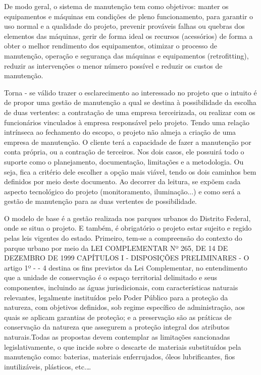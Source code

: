 	De modo geral, o sistema de manutenção tem como objetivos: manter os equipamentos e máquinas em condições de pleno funcionamento, para garantir o uso normal e a qualidade do projeto, prevenir prováveis falhas ou quebras dos elementos das máquinas, gerir de forma ideal os recursos (acessórios) de forma a obter o melhor rendimento dos equipamentos, otimizar o processo de manutenção, operação e segurança das máquinas e equipamentos (retrofitting), reduzir as intervenções o menor número possível e reduzir os custos de manutenção.
	
	Torna - se válido trazer o esclarecimento ao interessado no projeto que o intuito é de propor uma gestão de manutenção a qual se destina à possibilidade da escolha de duas vertentes: a contratação de uma empresa terceirizada, ou realizar com os funcionários vinculados à empresa responsável pelo projeto.  Tendo uma relação intrínseca ao fechamento do escopo, o projeto não almeja a criação de uma empresa de manutenção. O cliente terá a capacidade de fazer a manutenção por conta própria, ou a contração de terceiros. Nos dois casos, ele possuirá todo o suporte como o planejamento, documentação, limitações e a metodologia. Ou seja, fica a critério dele escolher a opção mais viável, tendo os dois caminhos bem definidos por meio deste documento. Ao decorrer da leitura, se expõem cada aspecto tecnológico do projeto (monitoramento, iluminação...) e como será a gestão de manutenção para as duas vertentes de possibilidade.
	
	O modelo de base é a gestão realizada nos parques urbanos do Distrito Federal, onde se situa o projeto. E também, é obrigatório o projeto estar sujeito e regido pelas leis vigentes do estado. Primeiro, tem-se a compreensão do contexto do parque urbano por meio da LEI COMPLEMENTAR Nº 265, DE 14 DE DEZEMBRO DE 1999 CAPÍTULOS I - DISPOSIÇÕES PRELIMINARES - O artigo 1º - - 4 destina os fins previstos da Lei Complementar, no entendimento que a unidade de conservação é o espaço territorial delimitado e seus componentes, incluindo as águas jurisdicionais, com características naturais relevantes, legalmente instituídos pelo Poder Público para a proteção da natureza, com objetivos definidos, sob regime específico de administração, aos quais se aplicam garantias de proteção; e a preservação são as práticas de conservação da natureza que assegurem a proteção integral dos atributos naturais.Todas as propostas devem contemplar as limitações sancionadas legislativamente, o que incide sobre o descarte de materiais substituídos pela manutenção como: baterias, materiais enferrujados, óleos lubrificantes, fios inutilizáveis, plásticos, etc.…
      

